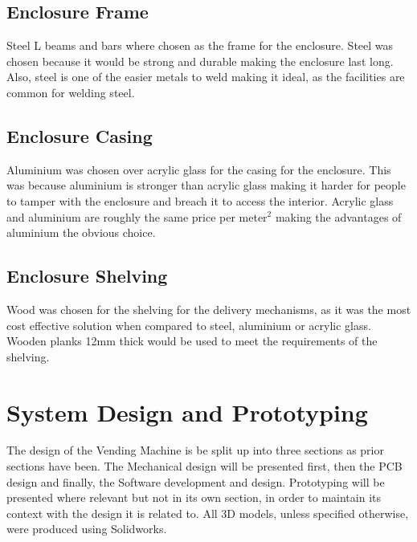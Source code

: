 \documentclass[a4paper,11pt]{article}
\numberwithin{figure}{section}
\numberwithin{table}{section}
\begin{document}
\subsection{Enclosure Frame}
Steel L beams and bars where chosen as the frame for the enclosure. Steel was chosen because it would be strong and durable making the enclosure last long. Also, steel is one of the easier metals to weld making it ideal, as the facilities are common for welding steel.

\subsection{Enclosure Casing}
Aluminium was chosen over acrylic glass for the casing for the enclosure. This was because aluminium is stronger than acrylic glass making it harder for people to tamper with the enclosure and breach it to access the interior. Acrylic glass and aluminium are roughly the same price per meter$^2$ making the advantages of aluminium the obvious choice.  

\subsection{Enclosure Shelving}
Wood was chosen for the shelving for the delivery mechanisms, as it was the most cost effective solution when compared to steel, aluminium or acrylic glass. Wooden planks 12mm thick would be used to meet the requirements of the shelving.

\newpage
\section{System Design and Prototyping}\thispagestyle{sectionstart}
The design of the Vending Machine is be split up into three sections as prior sections have been. The Mechanical design will be presented first, then the PCB design and finally, the Software development and design. Prototyping will be presented where relevant but not in its own section, in order to maintain its context with the design it is related to. All 3D models, unless specified otherwise, were produced using Solidworks.
\end{document}
